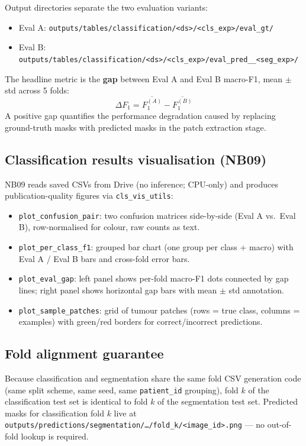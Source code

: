 \documentclass[12pt,a4paper]{article}
\begin{document}
Output directories separate the two evaluation variants:
\begin{itemize}[leftmargin=1.5em]
  \item Eval A: \texttt{outputs/tables/classification/<ds>/<cls\_exp>/eval\_gt/}
  \item Eval B: \texttt{outputs/tables/classification/<ds>/<cls\_exp>/eval\_pred\_\_<seg\_exp>/}
\end{itemize}

The headline metric is the \textbf{gap} between Eval A and Eval B macro-F1,
mean $\pm$ std across 5 folds:
\begin{equation}
  \Delta F_1 = \overline{F_1^{(A)}} - \overline{F_1^{(B)}}
\end{equation}
A positive gap quantifies the performance degradation caused by replacing
ground-truth masks with predicted masks in the patch extraction stage.

\subsection{Classification results visualisation (NB09)}

NB09 reads saved CSVs from Drive (no inference; CPU-only) and produces
publication-quality figures via \texttt{cls\_vis\_utils}:

\begin{itemize}[leftmargin=1.5em]
  \item \texttt{plot\_confusion\_pair}: two confusion matrices side-by-side
    (Eval A vs.\ Eval B), row-normalised for colour, raw counts as text.
  \item \texttt{plot\_per\_class\_f1}: grouped bar chart (one group per class +
    macro) with Eval A / Eval B bars and cross-fold error bars.
  \item \texttt{plot\_eval\_gap}: left panel shows per-fold macro-F1 dots
    connected by gap lines; right panel shows horizontal gap bars with
    mean $\pm$ std annotation.
  \item \texttt{plot\_sample\_patches}: grid of tumour patches
    (rows = true class, columns = examples) with green/red borders for
    correct/incorrect predictions.
\end{itemize}

\subsection{Fold alignment guarantee}

Because classification and segmentation share the same fold CSV generation
code (same split scheme, same seed, same \texttt{patient\_id} grouping),
fold $k$ of the classification test set is identical to fold $k$ of the
segmentation test set.  Predicted masks for classification fold $k$ live at
\texttt{outputs/predictions/segmentation/\ldots/fold\_k/<image\_id>.png} --- no
out-of-fold lookup is required.
\end{document}
